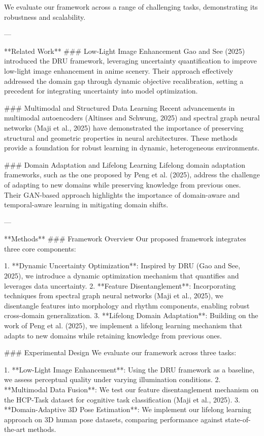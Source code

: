 We evaluate our framework across a range of challenging tasks, demonstrating its robustness and scalability.  

---

**Related Work**  
### Low-Light Image Enhancement  
Gao and See (2025) introduced the DRU framework, leveraging uncertainty quantification to improve low-light image enhancement in anime scenery. Their approach effectively addressed the domain gap through dynamic objective recalibration, setting a precedent for integrating uncertainty into model optimization.  

### Multimodal and Structured Data Learning  
Recent advancements in multimodal autoencoders (Altinses and Schwung, 2025) and spectral graph neural networks (Maji et al., 2025) have demonstrated the importance of preserving structural and geometric properties in neural architectures. These methods provide a foundation for robust learning in dynamic, heterogeneous environments.  

### Domain Adaptation and Lifelong Learning  
Lifelong domain adaptation frameworks, such as the one proposed by Peng et al. (2025), address the challenge of adapting to new domains while preserving knowledge from previous ones. Their GAN-based approach highlights the importance of domain-aware and temporal-aware learning in mitigating domain shifts.  

---

**Methods**  
### Framework Overview  
Our proposed framework integrates three core components:  

1. **Dynamic Uncertainty Optimization**: Inspired by DRU (Gao and See, 2025), we introduce a dynamic optimization mechanism that quantifies and leverages data uncertainty.  
2. **Feature Disentanglement**: Incorporating techniques from spectral graph neural networks (Maji et al., 2025), we disentangle features into morphology and rhythm components, enabling robust cross-domain generalization.  
3. **Lifelong Domain Adaptation**: Building on the work of Peng et al. (2025), we implement a lifelong learning mechanism that adapts to new domains while retaining knowledge from previous ones.  

### Experimental Design  
We evaluate our framework across three tasks:  

1. **Low-Light Image Enhancement**: Using the DRU framework as a baseline, we assess perceptual quality under varying illumination conditions.  
2. **Multimodal Data Fusion**: We test our feature disentanglement mechanism on the HCP-Task dataset for cognitive task classification (Maji et al., 2025).  
3. **Domain-Adaptive 3D Pose Estimation**: We implement our lifelong learning approach on 3D human pose datasets, comparing performance against state-of-the-art methods.  

